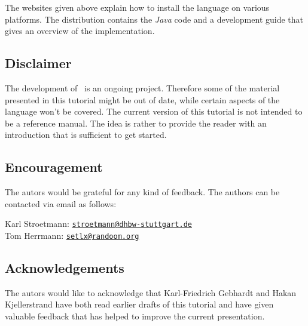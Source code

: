 The websites given above explain how to install the language on various platforms.  
The distribution contains the \textsl{Java} code and a development guide that gives an
overview of the implementation. 

\subsection*{Disclaimer}
The development of \setlx\ is an ongoing project.  Therefore some of the material presented in
this tutorial might be out of date, while certain aspects of the language won't be
covered.  The current version of this tutorial is not intended to be a reference manual.
The idea is rather to provide the reader with an introduction that is sufficient to get started.

\subsection*{Encouragement}
The autors would be grateful for any kind of feedback.  The authors can be contacted via
email as follows:
\begin{tabbing}
\qquad \= Karl Stroetmann: \qquad \= \href{mailto:stroetmann@dhbw-stuttgart.de}{\texttt{stroetmann@dhbw-stuttgart.de}} \\[0.2cm]
       \> Tom Herrmann:           \> \href{mailto:setlx@randoom.org}{\texttt{setlx@randoom.org}}
\end{tabbing}

\subsection*{Acknowledgements}
The autors would like to acknowledge that Karl-Friedrich Gebhardt and Hakan Kjellerstrand 
have both  read earlier drafts of
this tutorial and have given valuable feedback that has helped to improve the current
presentation. 

